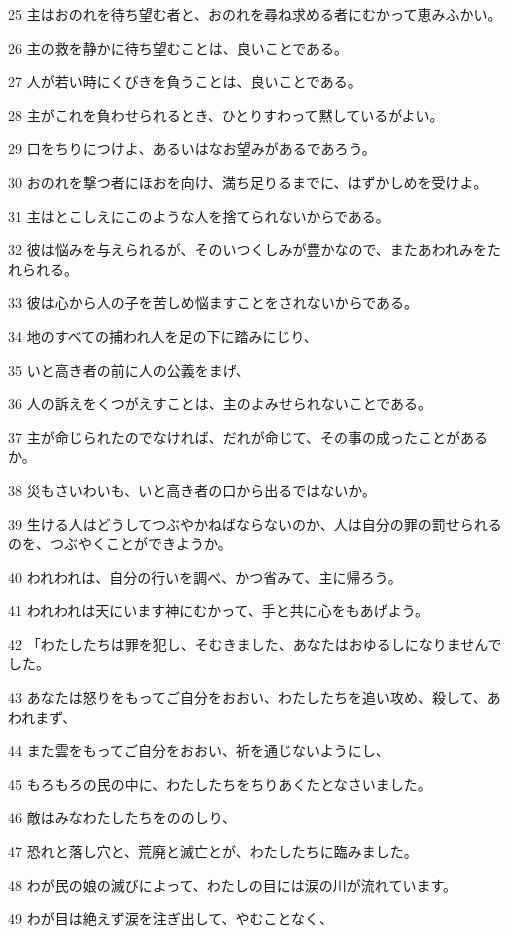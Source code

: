 \par 25 主はおのれを待ち望む者と、おのれを尋ね求める者にむかって恵みふかい。
\par 26 主の救を静かに待ち望むことは、良いことである。
\par 27 人が若い時にくびきを負うことは、良いことである。
\par 28 主がこれを負わせられるとき、ひとりすわって黙しているがよい。
\par 29 口をちりにつけよ、あるいはなお望みがあるであろう。
\par 30 おのれを撃つ者にほおを向け、満ち足りるまでに、はずかしめを受けよ。
\par 31 主はとこしえにこのような人を捨てられないからである。
\par 32 彼は悩みを与えられるが、そのいつくしみが豊かなので、またあわれみをたれられる。
\par 33 彼は心から人の子を苦しめ悩ますことをされないからである。
\par 34 地のすべての捕われ人を足の下に踏みにじり、
\par 35 いと高き者の前に人の公義をまげ、
\par 36 人の訴えをくつがえすことは、主のよみせられないことである。
\par 37 主が命じられたのでなければ、だれが命じて、その事の成ったことがあるか。
\par 38 災もさいわいも、いと高き者の口から出るではないか。
\par 39 生ける人はどうしてつぶやかねばならないのか、人は自分の罪の罰せられるのを、つぶやくことができようか。
\par 40 われわれは、自分の行いを調べ、かつ省みて、主に帰ろう。
\par 41 われわれは天にいます神にむかって、手と共に心をもあげよう。
\par 42 「わたしたちは罪を犯し、そむきました、あなたはおゆるしになりませんでした。
\par 43 あなたは怒りをもってご自分をおおい、わたしたちを追い攻め、殺して、あわれまず、
\par 44 また雲をもってご自分をおおい、祈を通じないようにし、
\par 45 もろもろの民の中に、わたしたちをちりあくたとなさいました。
\par 46 敵はみなわたしたちをののしり、
\par 47 恐れと落し穴と、荒廃と滅亡とが、わたしたちに臨みました。
\par 48 わが民の娘の滅びによって、わたしの目には涙の川が流れています。
\par 49 わが目は絶えず涙を注ぎ出して、やむことなく、
